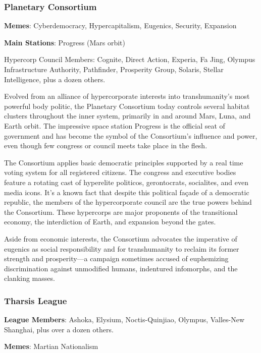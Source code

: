 \subsubsection{Planetary Consortium}
\label{sec:planetary-consortium}

\textbf{Memes}: Cyberdemocracy, Hypercapitalism, Eugenics, Security,
Expansion

\textbf{Main Stations}: Progress (Mars orbit)


Hypercorp Council Members: Cognite, Direct Action, Experia, Fa Jing,
Olympus Infrastructure Authority, Pathfinder, Prosperity Group,
Solaris, Stellar Intelligence, plus a dozen others.

Evolved from an alliance of hypercorporate interests into
transhumanity's most powerful body politic, the Planetary Consortium
today controls several habitat clusters throughout the inner system,
primarily in and around Mars, Luna, and Earth orbit. The impressive
space station Progress is the official seat of government and has
become the symbol of the Consortium's influence and power, even though
few congress or council meets take place in the flesh.

The Consortium applies basic democratic principles supported by a real
time voting system for all registered citizens. The congress and
executive bodies feature a rotating cast of hyperelite politicos,
gerontocrats, socialites, and even media icons. It's a known fact that
despite this political façade of a democratic republic, the members of
the hypercorporate council are the true powers behind the
Consortium. These hypercorps are major proponents of the transitional
economy, the interdiction of Earth, and expansion beyond the gates.

Aside from economic interests, the Consortium advocates the imperative
of eugenics as social responsibility and for transhumanity to reclaim
its former strength and prosperity—a campaign sometimes accused of
euphemizing discrimination against unmodified humans, indentured
infomorphs, and the clanking masses.

\subsubsection{Tharsis League}
\label{sec:tharsis-league}

\textbf{League Members}: Ashoka, Elysium, Noctis-Quinjiao, Olympus,
Valles-New Shanghai, plus over a dozen others.

\textbf{Memes}: Martian Nationalism

